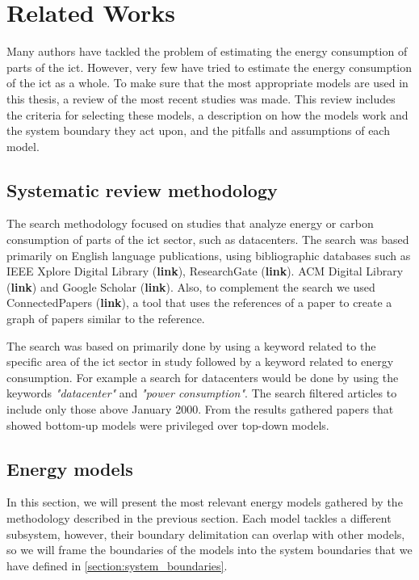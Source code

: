 \chapter{Related Works}
\label{chapter:related_works}

\begin{introduction}
    Many authors have tackled the problem of estimating the energy consumption of parts of the \ac{ict}. However, very few have tried to estimate the energy consumption of the \ac{ict} as a whole. To make sure that the most appropriate models are used in this thesis, a review of the most recent studies was made. This review includes the criteria for selecting these models, a description on how the models work and the system boundary they act upon, and the pitfalls and assumptions of each model.
\end{introduction}

\section{Systematic review methodology}

The search methodology focused on studies that analyze energy or carbon consumption of parts of the \ac{ict} sector, such as datacenters. The search was based primarily on English language publications, using bibliographic databases such as IEEE Xplore Digital Library (\textbf{link}), ResearchGate (\textbf{link}). ACM Digital Library (\textbf{link}) and Google Scholar (\textbf{link}). Also, to complement the search we used ConnectedPapers (\textbf{link}), a tool that uses the references of a paper to create a graph of papers similar to the reference.

The search was based on primarily done by using a keyword related to the specific area of the \ac{ict} sector in study followed by a keyword related to energy consumption. For example a search for datacenters would be done by using the keywords \textit{"datacenter"} and \textit{"power consumption"}. The search filtered articles to include only those above January 2000. 
From the results gathered papers that showed bottom-up models were privileged over top-down models. 

\section{Energy models}

In this section, we will present the most relevant energy models gathered by the methodology described in the previous section. Each model tackles a different subsystem, however, their boundary delimitation can overlap with other models, so we will frame the boundaries of the models into the system boundaries that we have defined in \ref{section:system_boundaries}.

